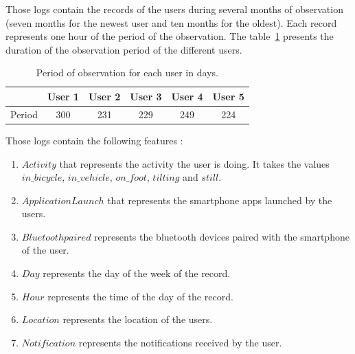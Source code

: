\noindent
Those logs contain the records of the users during several months of observation (seven months for the newest user and ten months for the oldest). Each record represents one hour of the period of the observation. The table~\ref{duration} presents the duration of the observation period of the different users.

\begin{table}[H] 
\centering
\begin{tabular}{|l|c|c|c|c|c|}
  \hline
  &User 1 & User 2 & User 3 & User 4 & User 5 \\
 \hline
  Period & 300 & 231 & 229 & 249 &  224 \\
 \hline
\end{tabular}
\caption {Period of observation for each user in days.} 
\label{duration}
\end{table}

Those logs contain the following features :

\begin{enumerate}
\item $Activity$ that represents the activity the user is doing. It takes the values $in\_bicycle$, $in\_vehicle$, $on\_foot$, $tilting$ and $still$.
\item $Application Launch$ that represents the smartphone apps launched by the users.
\item $Bluetooth paired$ represents the bluetooth devices paired with the smartphone of the user.
\item $Day$ represents the day of the week of the record.
\item $Hour$ represents the time of the day of the record.
\item $Location$ represents the location of the users.
\item $Notification$ represents the notifications received by the user.
\end{enumerate}


